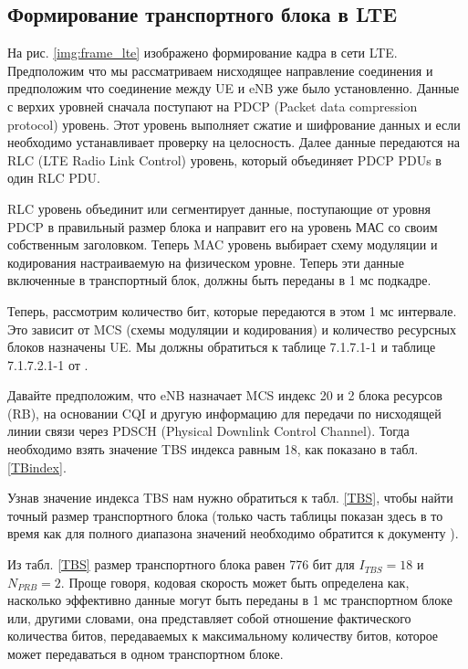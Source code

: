 \subsection{Формирование транспортного блока в LTE} \label{sect1_3_3}

На рис. \ref{img:frame_lte} изображено формирование кадра в сети LTE. Предположим что мы рассматриваем нисходящее направление соединения и предположим что соединение между UE и eNB уже было установленно. Данные с верхих уровней сначала поступают на PDCP (Packet data compression protocol) уровень. Этот уровень выполняет сжатие и шифрование данных и если необходимо устанавливает проверку на целосность. Далее данные передаются на RLC (LTE Radio Link Control) уровень, который объединяет PDCP PDUs в один RLC PDU.

RLC уровень объединит или сегментирует данные, поступающие от уровня PDCP в правильный размер блока и направит его на уровень МАС со своим собственным заголовком. Теперь MAC уровень выбирает схему модуляции и кодирования настраиваемую на физическом уровне. Теперь эти данные включенные в транспортный блок, должны быть переданы в 1 мс подкадре.

Теперь, рассмотрим количество бит, которые передаются в этом 1 мс интервале. Это зависит от MCS (схемы модуляции и кодирования) и количество ресурсных блоков назначены UE. Мы должны обратиться к таблице 7.1.7.1-1 и таблице 7.1.7.2.1-1 от \cite{3GPPTS36213}.

Давайте предположим, что eNB назначает MCS индекс 20 и 2 блока ресурсов (RB), на основании CQI и другую информацию для передачи по нисходящей линии связи через PDSCH (Physical Downlink Control Channel). Тогда необходимо взять значение TBS индекса равным 18, как показано в табл. \ref{TBindex}.

Узнав значение индекса TBS нам нужно обратиться к табл. \ref{TBS}, чтобы найти точный размер транспортного блока (только часть таблицы показан здесь в то время как для полного диапазона значений необходимо обратится к документу \cite{3GPPTS36213}).

Из табл. \ref{TBS} размер транспортного блока равен 776 бит для $I_{TBS}=18$ и  $N_{PRB}=2$. Проще говоря, кодовая скорость может быть определена как, насколько эффективно данные могут быть переданы в 1 мс транспортном блоке или, другими словами, она представляет собой отношение фактического количества битов, передаваемых к максимальному количеству битов, которое может передаваться в одном транспортном блоке.



